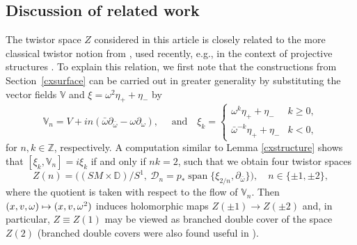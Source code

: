 \documentclass[JEP,XML,SOM,Unicode,published]{cedram}
\newcommand\mto{\mathchoice{\longmapsto}{\mapsto}{\mapsto}{\mapsto}}
\theoremstyle{plain}
\theoremstyle{definition}
\newcommand{\Z}{\mathbb{Z}}
\newcommand{\DD}{\mathbb{D}}
\newcommand{\V}{\mathbb{V}}
\newcommand{\D}{\mathscr{D}}
\DeclareMathOperator{\spn}{span}
\newcommand{\1}{{\bf 1}}
\begin{document}
\subsection{Discussion of related work}\label{relatedwork}

The twistor space $Z$ considered in this article is closely related to the more classical twistor notion from \cite{Dub83,OR85}, used recently, e.g., in the context of projective structures \cite{Met21,MePa20}. To explain this relation, we first note that the constructions from Section~\ref{cxsurface} can be carried out in greater generality by substituting the vector fields $\V$ and $\xi=\omega^2\eta_++\eta_-$ by
\begin{equation*}
\V_n = V + i n (\bar \omega \partial_{\bar \omega} - \omega \partial_\omega),\quad \text{ and} \quad \xi_k =\begin{cases}
\omega^k \eta_+ + \eta_- & k \ge 0,\\
\bar \omega^{-k} \eta_+ + \eta_- & k<0,
\end{cases}
\end{equation*}
for $n,k\in \Z$, respectively. A computation similar to Lemma \ref{cxstructure} shows that $[\xi_k,\V_n]=i\xi_k$ if and only if $nk=2$, such that we obtain four twistor spaces
\begin{equation*}
Z(n) = \big((SM\times \DD)/S^1,~ \D_n=p_*\spn \{\xi_{2/n},\partial_{\bar \omega} \} \big),\quad n\in \{\pm 1, \pm 2\},
\end{equation*}
where the quotient is taken with respect to the flow of $\V_n$. Then $(x,v,\omega)\mto (x,v,\omega^2)$ induces holomorphic maps $Z(\pm 1)\to Z(\pm 2)$ and, in particular, $Z\equiv Z(1)$ may be viewed as branched double cover of the space $Z(2)$ (branched double covers were also found useful in \cite{LM10}).
\end{document}
